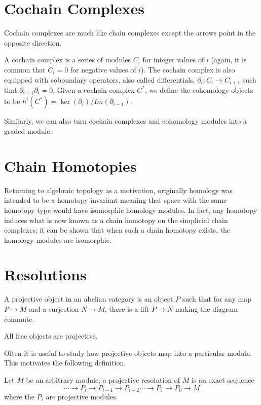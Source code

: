 \section{Cochain Complexes}
Cochain complexes are much like chain complexes except the arrows point in the
opposite direction.
\begin{definition} A cochain complex is a series of modules $C_i$ for integer
values of $i$ (again, it is common that $C_i=0$ for negative values of $i$). The
cochain complex is also equipped with coboundary operators, also called
differentials, $\partial_i:C_i\rightarrow C_{i+1}$ such that
$\partial_{i+1}\partial_i=0$. Given a cochain complex $C^*$, we define the
cohomology objects to be $h^i(C^*)=\ker(\partial_i)/Im(\partial_{i-1})$.
\end{definition}
Similarly, we can also turn cochain complexes and cohomology modules into a
graded module.

\section{Chain Homotopies}
Returning to algebraic topology as a motivation, originally homology was
intended to be a homotopy invariant meaning that space with the same homotopy
type would have isomorphic homology modules. In fact, any homotopy induces what
is now known as a chain homotopy on the simplicial chain complexes; it can be
shown that when such a chain homotopy exists, the homology modules are
isomorphic.

\section{Resolutions}


\begin{definition} A projective object in an abelian category is an object $P$
such that for any map $P\rightarrow M$ and a surjection $N\rightarrow M$, there
is a lift $P\rightarrow N$ making the diagram commute. \end{definition}
\begin{example} All free objects are projective. \end{example}

Often it is useful to study how projective objects map into a particular module.
This motivates the following definition.


\begin{definition} Let $M$ be an arbitrary module, a projective resolution of
$M$ is an exact sequence
\begin{equation} \cdots\rightarrow P_i\rightarrow P_{i-1}\rightarrow
P_{i-2}\cdots\rightarrow P_1\rightarrow P_0\rightarrow M \end{equation} where
the $P_i$ are projective modules. \end{definition}


